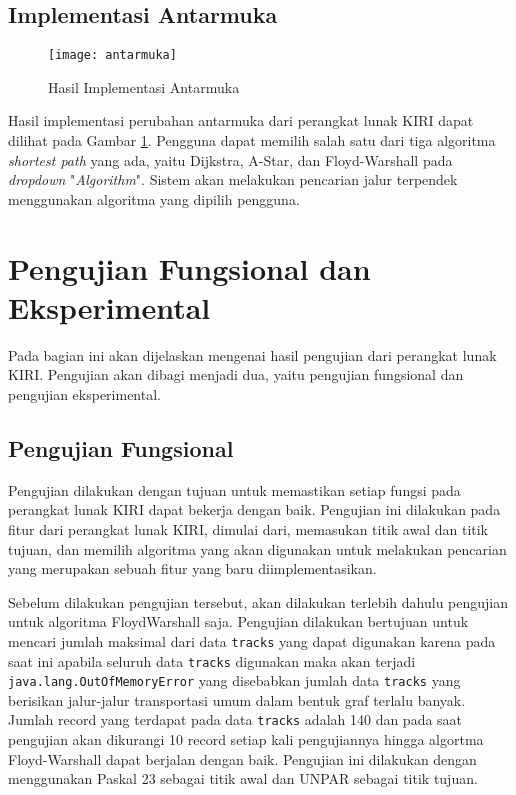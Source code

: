 \subsection{Implementasi Antarmuka}
\label{subsec:penjelasankode}
\begin{figure}[H]
    \centering
    \texttt{[image: antarmuka]}
    \caption{Hasil Implementasi Antarmuka}
    \label{fig:antarmuka}
\end{figure}

\noindent
Hasil implementasi perubahan antarmuka dari perangkat lunak KIRI dapat dilihat pada Gambar \ref{fig:antarmuka}. Pengguna dapat memilih salah satu dari tiga algoritma \textit{shortest path} yang ada, yaitu Dijkstra, A-Star, dan Floyd-Warshall pada \textit{dropdown} "\textit{Algorithm}". Sistem akan melakukan pencarian jalur terpendek menggunakan algoritma yang dipilih pengguna.

\section{Pengujian Fungsional dan Eksperimental}
\label{sec:pengujian}
Pada bagian ini akan dijelaskan mengenai hasil pengujian dari perangkat lunak KIRI. Pengujian akan dibagi menjadi dua, yaitu pengujian fungsional dan pengujian eksperimental.

\subsection{Pengujian Fungsional}
\label{subsec:pengujianfungsional}
Pengujian dilakukan dengan tujuan untuk memastikan setiap fungsi pada perangkat lunak KIRI dapat bekerja dengan baik. Pengujian ini dilakukan pada fitur dari perangkat lunak KIRI, dimulai dari, memasukan titik awal dan titik tujuan, dan memilih algoritma yang akan digunakan untuk melakukan pencarian yang merupakan sebuah fitur yang baru diimplementasikan.

Sebelum dilakukan pengujian tersebut, akan dilakukan terlebih dahulu pengujian untuk algoritma FloydWarshall saja. Pengujian dilakukan bertujuan untuk mencari jumlah maksimal dari data \texttt{tracks} yang dapat digunakan karena pada saat ini apabila seluruh data \texttt{tracks} digunakan maka akan terjadi \texttt{java.lang.OutOfMemoryError} yang disebabkan jumlah data \texttt{tracks} yang berisikan jalur-jalur transportasi umum dalam bentuk graf terlalu banyak. Jumlah record yang terdapat pada data \texttt{tracks} adalah 140 dan pada saat pengujian akan dikurangi 10 record setiap kali pengujiannya hingga algortma Floyd-Warshall dapat berjalan dengan baik. Pengujian ini dilakukan dengan menggunakan Paskal 23 sebagai titik awal dan UNPAR sebagai titik tujuan.


